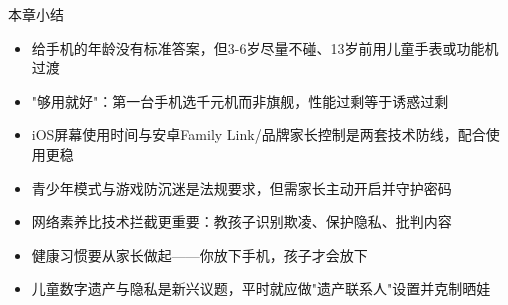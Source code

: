 \begin{tcbsummary}{本章小结}
\begin{itemize}
  \item 给手机的年龄没有标准答案，但3-6岁尽量不碰、13岁前用儿童手表或功能机过渡
  \item "够用就好"：第一台手机选千元机而非旗舰，性能过剩等于诱惑过剩
  \item iOS屏幕使用时间与安卓Family Link/品牌家长控制是两套技术防线，配合使用更稳
  \item 青少年模式与游戏防沉迷是法规要求，但需家长主动开启并守护密码
  \item 网络素养比技术拦截更重要：教孩子识别欺凌、保护隐私、批判内容
  \item 健康习惯要从家长做起——你放下手机，孩子才会放下
  \item 儿童数字遗产与隐私是新兴议题，平时就应做"遗产联系人"设置并克制晒娃
\end{itemize}

\end{tcbsummary}
